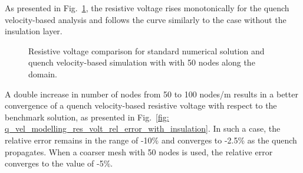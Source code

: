 As presented in Fig.~\ref{fig: q_vel_modelling_res_volt_benchmarking_with_insulation}, the resistive voltage rises monotonically for the quench velocity-based analysis and follows the curve similarly to the case without the insulation layer. 

\begin{figure}[H]
\centering
    \caption{Resistive voltage comparison for standard numerical solution and quench velocity-based simulation with with 50 nodes along the domain.}
    \label{fig: q_vel_modelling_res_volt_benchmarking_with_insulation}
\end{figure}

A double increase in number of nodes from 50 to 100 nodes/m results in a better convergence of a quench velocity-based resistive voltage with respect to the benchmark solution, as presented in Fig.~\ref{fig: q_vel_modelling_res_volt_rel_error_with_insulation}. In such a case, the relative error remains in the range of -10\% and converges to -2.5\% as the quench propagates. When a coarser mesh with 50 nodes is used, the relative error converges to the value of -5\%. 

